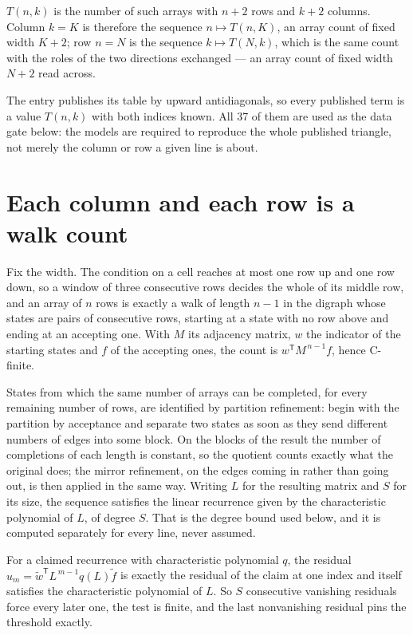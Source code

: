 \documentclass[11pt]{article}
\theoremstyle{definition}
\begin{document}
$T(n,k)$ is the number of such arrays with $n + 2$ rows and $k + 2$ columns. Column $k = K$ is therefore the sequence $n \mapsto T(n,K)$, an array count of fixed width $K + 2$; row $n = N$ is the sequence $k \mapsto T(N,k)$, which is the same count with the roles of the two directions exchanged --- an array count of fixed width $N + 2$ read across.

The entry publishes its table by upward antidiagonals, so every published term is a value $T(n,k)$ with both indices known. All 37 of them are used as the data gate below: the models are required to reproduce the whole published triangle, not merely the column or row a given line is about.

\section{Each column and each row is a walk count}

Fix the width. The condition on a cell reaches at most one row up and one row down, so a window of three consecutive rows decides the whole of its middle row, and an array of $n$ rows is exactly a walk of length $n-1$ in the digraph whose states are pairs of consecutive rows, starting at a state with no row above and ending at an accepting one. With $M$ its adjacency matrix, $w$ the indicator of the starting states and $f$ of the accepting ones, the count is $w^{\mathsf T}M^{\,n-1}f$, hence C-finite.

States from which the same number of arrays can be completed, for every remaining number of rows, are identified by partition refinement: begin with the partition by acceptance and separate two states as soon as they send different numbers of edges into some block. On the blocks of the result the number of completions of each length is constant, so the quotient counts exactly what the original does; the mirror refinement, on the edges coming in rather than going out, is then applied in the same way. Writing $L$ for the resulting matrix and $S$ for its size, the sequence satisfies the linear recurrence given by the characteristic polynomial of $L$, of degree $S$. That is the degree bound used below, and it is computed separately for every line, never assumed.

For a claimed recurrence with characteristic polynomial $q$, the residual $u_m = \tilde w^{\mathsf T}L^{\,m-1}q(L)\tilde f$ is exactly the residual of the claim at one index and itself satisfies the characteristic polynomial of $L$. So $S$ consecutive vanishing residuals force every later one, the test is finite, and the last nonvanishing residual pins the threshold exactly.
\end{document}
